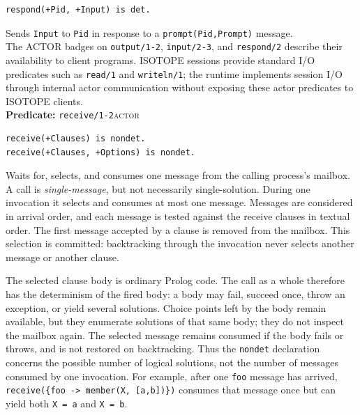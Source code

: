 \begin{verbatim}
respond(+Pid, +Input) is det.
\end{verbatim}

\noindent Sends \texttt{Input} to \texttt{Pid} in response to a
\texttt{prompt(\allowbreak{}Pid,\allowbreak{}Prompt)} message.\\

\noindent The ACTOR badges on \texttt{output/\allowbreak{}1-2}, \texttt{input/\allowbreak{}2-3}, and
\texttt{respond/\allowbreak{}2} describe their availability to client programs.
ISOTOPE sessions provide standard I/O predicates such as \texttt{read/\allowbreak{}1}
and \texttt{writeln/\allowbreak{}1}; the runtime implements session I/O through internal
actor communication without exposing these actor predicates to ISOTOPE
clients.\\


\noindent \textbf{Predicate:} \texttt{receive/\allowbreak{}1-2}\hfill\textsc{actor}

\begin{verbatim}
receive(+Clauses) is nondet.
receive(+Clauses, +Options) is nondet.
\end{verbatim}

\noindent Waits for, selects, and consumes one message from the calling
process's mailbox. A call is \emph{single-message}, but not necessarily
single-solution. During one invocation it selects and consumes at most one
message. Messages are considered in arrival order, and each message is tested
against the receive clauses in textual order. The first message accepted by a
clause is removed from the mailbox. This selection is committed: backtracking
through the invocation never selects another message or another clause.

The selected clause body is ordinary Prolog code. The call as a whole
therefore has the determinism of the fired body: a body may fail, succeed once,
throw an exception, or yield several solutions. Choice points left by the body
remain available, but they enumerate solutions of that same body; they do not
inspect the mailbox again. The selected message remains consumed if the body
fails or throws, and is not restored on backtracking. Thus the
\texttt{nondet} declaration concerns the possible number of logical solutions,
not the number of messages consumed by one invocation. For example, after one
\texttt{foo} message has arrived,
\texttt{receive(\{foo -> member(X,\,[a,b])\})} consumes that message once but
can yield both \texttt{X = a} and \texttt{X = b}.

